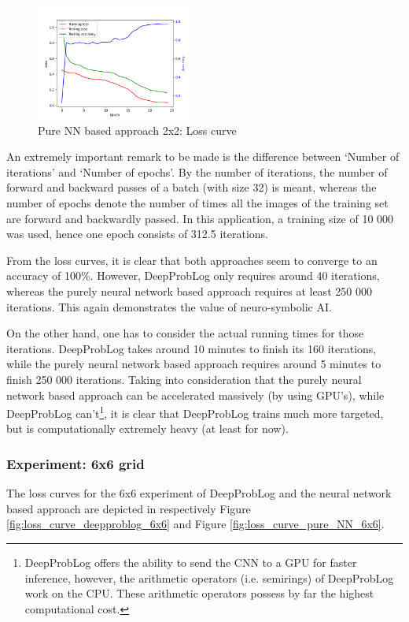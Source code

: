 \documentclass[english]{sobraep}
\begin{document}
\begin{figure}[htp]
    \begin{center}
    \includegraphics[width=0.45\textwidth]{loss_curve_pure_NN_2x2.png} 
    \captionsetup{justification=centering}
    \caption{Pure NN based approach 2x2: Loss curve}
    \label{fig:loss_curve_pure_NN_2x2}
    \end{center}
\end{figure}
An extremely important remark to be made is the difference between `Number of iterations' and `Number of epochs'. By the number of iterations, the number of forward and backward passes of a batch (with size 32) is meant, whereas the number of epochs denote the number of times all the images of the training set are forward and backwardly passed. In this application, a training size of 10 000 was used, hence one epoch consists of 312.5 iterations.

From the loss curves, it is clear that both approaches seem to converge to an accuracy of 100\%. However, DeepProbLog only requires around 40 iterations, whereas the purely neural network based approach requires at least 250 000 iterations. This again demonstrates the value of neuro-symbolic AI.

On the other hand, one has to consider the actual running times for those iterations. DeepProbLog takes around 10 minutes to finish its 160 iterations, while the purely neural network based approach requires around 5 minutes to finish 250 000 iterations. Taking into consideration that the purely neural network based approach can be accelerated massively (by using GPU's), while DeepProbLog can't\footnote{DeepProbLog offers the ability to send the CNN to a GPU for faster inference, however, the arithmetic operators (i.e. semirings) of DeepProbLog work on the CPU. These arithmetic operators possess by far the highest computational cost.}, it is clear that DeepProbLog trains much more targeted, but is computationally extremely heavy (at least for now).

\subsubsection{Experiment: 6x6 grid}
The loss curves for the 6x6 experiment of DeepProbLog and the neural network based approach are depicted in respectively Figure \ref{fig:loss_curve_deepproblog_6x6} and Figure \ref{fig:loss_curve_pure_NN_6x6}.
\end{document}
